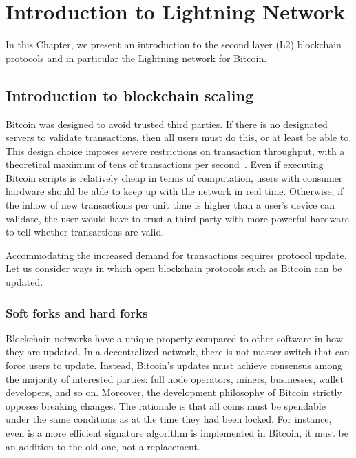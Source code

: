 \chapter{Introduction to Lightning Network}

\label{Chapter05IntroLightning}

In this Chapter, we present an introduction to the second layer (L2) blockchain protocols and in particular the Lightning network for Bitcoin.

\section{Introduction to blockchain scaling}

Bitcoin was designed to avoid trusted third parties.
If there is no designated servers to validate transactions, then all users must do this, or at least be able to.
This design choice imposes severe restrictions on transaction throughput, with a theoretical maximum of tens of transactions per second~\cite{Croman2016}.
Even if executing Bitcoin scripts is relatively cheap in terms of computation, users with consumer hardware should be able to keep up with the network in real time.
Otherwise, if the inflow of new transactions per unit time is higher than a user's device can validate, the user would have to trust a third party with more powerful hardware to tell whether transactions are valid.

Accommodating the increased demand for transactions requires protocol update.
Let us consider ways in which open blockchain protocols such as Bitcoin can be updated.

\subsection{Soft forks and hard forks}
Blockchain networks have a unique property compared to other software in how they are updated.
In a decentralized network, there is not master switch that can force users to update.
Instead, Bitcoin's updates must achieve consensus among the majority of interested parties: full node operators, miners, businesses, wallet developers, and so on.
Moreover, the development philosophy of Bitcoin strictly opposes breaking changes.
The rationale is that all coins must be spendable under the same conditions as at the time they had been locked.
For instance, even is a more efficient signature algorithm is implemented in Bitcoin, it must be an addition to the old one, not a replacement.


